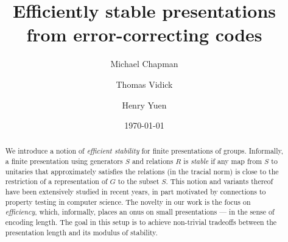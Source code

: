 \documentclass[11pt]{article}
\theoremstyle{definition}
\begin{document}
\title{Efficiently stable presentations from error-correcting codes}

\author[1]{Michael Chapman}
\author[2]{Thomas Vidick}
\author[3]{Henry Yuen}

\date{\today}
\maketitle

\noteswarning


\begin{abstract}
We introduce a notion of \emph{efficient stability} for finite presentations of groups. Informally, a finite presentation using generators $S$ and relations $R$ is \emph{stable} if any map from $S$ to unitaries 
that approximately satisfies the relations (in the tracial norm) is close to the restriction of a representation of $G$ to the subset $S$. This notion and variants thereof have been extensively studied in recent years, in part motivated by connections to property testing in computer science. The novelty in our work is the focus on \emph{efficiency}, which, informally, places an onus on small presentations --- in the sense of encoding length.  
The goal in this setup is to achieve non-trivial tradeoffs between the presentation length and its modulus of stability.



\end{abstract}
\end{document}

